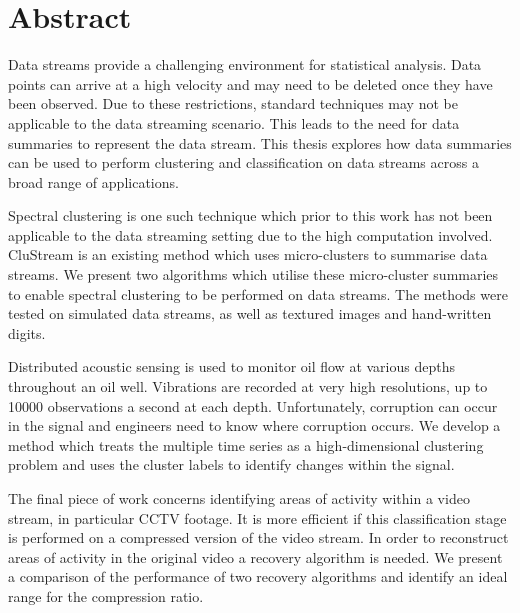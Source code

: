 %							

%								

\chapter*{Abstract}

Data streams provide a challenging environment for statistical analysis. Data points can arrive at a high velocity and may need to be deleted once they have been observed. Due to these restrictions, standard techniques may not be applicable to the data streaming scenario. This leads to the need for data summaries to represent the data stream. This thesis explores how data summaries can be used to perform clustering and classification on data streams across a broad range of applications.

Spectral clustering is one such technique which prior to this work has not been applicable to the data streaming setting due to the high computation involved. CluStream is an existing method which uses micro-clusters to summarise data streams. We present two algorithms which utilise these micro-cluster summaries to enable spectral clustering to be performed on data streams. The methods were tested on simulated data streams, as well as textured images and hand-written digits.

Distributed acoustic sensing is used to monitor oil flow at various depths throughout an oil well. Vibrations are recorded at very high resolutions, up to 10000 observations a second at each depth. Unfortunately, corruption can occur in the signal and engineers need to know where corruption occurs. We develop a method which treats the multiple time series as a high-dimensional clustering problem and uses the cluster labels to identify changes within the signal.

The final piece of work concerns identifying areas of activity within a video stream, in particular CCTV footage. It is more efficient if this classification stage is performed on a compressed version of the video stream. In order to reconstruct areas of activity in the original video a recovery algorithm is needed. We present a comparison of the performance of two recovery algorithms and identify an ideal range for the compression ratio. 

